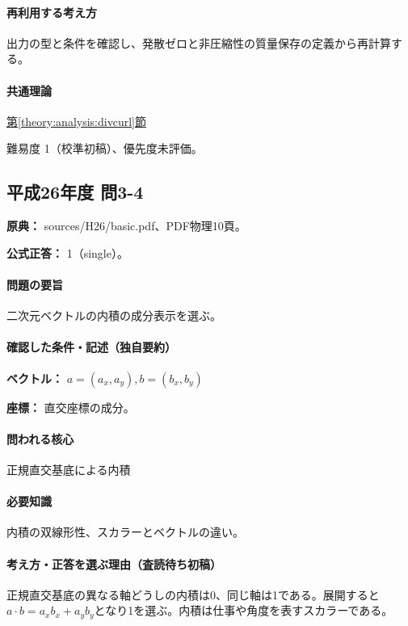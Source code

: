 \paragraph{再利用する考え方} 出力の型と条件を確認し、発散ゼロと非圧縮性の質量保存の定義から再計算する。

\paragraph{共通理論} \hyperref[theory:analysis:divcurl]{第\ref*{theory:analysis:divcurl}節}

\par 難易度 1（校準初稿）、優先度未評価。

\subsection{平成26年度 問3-4}
\label{q:h26-reg-basic-3-4}

\noindent\textbf{原典：} sources/H26/basic.pdf、PDF物理10頁。

\textbf{公式正答：} 1（single）。

\paragraph{問題の要旨} 二次元ベクトルの内積の成分表示を選ぶ。

\paragraph{確認した条件・記述（独自要約）}\mbox{}\par

\noindent\textbf{ベクトル：} \(a=(a_x,a_y),b=(b_x,b_y)\)\par

\noindent\textbf{座標：} 直交座標の成分。\par

\paragraph{問われる核心} 正規直交基底による内積

\paragraph{必要知識} 内積の双線形性、スカラーとベクトルの違い。

\paragraph{考え方・正答を選ぶ理由（査読待ち初稿）} 正規直交基底の異なる軸どうしの内積は0、同じ軸は1である。展開すると\(a\cdot b=a_xb_x+a_yb_y\)となり1を選ぶ。内積は仕事や角度を表すスカラーである。

